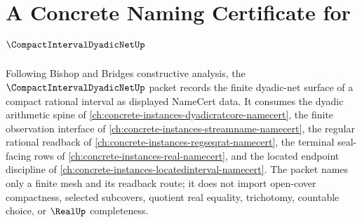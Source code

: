 \chapter{A Concrete Naming Certificate for $\CompactIntervalDyadicNetUp$}
\label{ch:concrete-instances-compact-interval-dyadic-net-namecert}

Following Bishop and Bridges constructive analysis, the $\CompactIntervalDyadicNetUp$ packet records the finite dyadic-net surface of a compact rational interval as displayed NameCert data. It consumes the dyadic arithmetic spine of \autoref{ch:concrete-instances-dyadicratcore-namecert}, the finite observation interface of \autoref{ch:concrete-instances-streamname-namecert}, the regular rational readback of \autoref{ch:concrete-instances-regseqrat-namecert}, the terminal seal-facing rows of \autoref{ch:concrete-instances-real-namecert}, and the located endpoint discipline of \autoref{ch:concrete-instances-locatedinterval-namecert}. The packet names only a finite mesh and its readback route; it does not import open-cover compactness, selected subcovers, quotient real equality, trichotomy, countable choice, or $\RealUp$ completeness.

